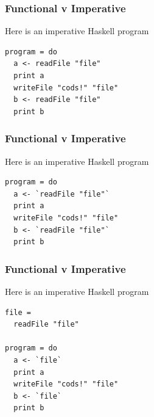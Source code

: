 \begin{frame}[fragile]
\frametitle{Functional v Imperative}
\begin{block}{Here is an imperative Haskell program}
\begin{lstlisting}[style=haskell,mathescape]
program = do
  a <- readFile "file"
  print a
  writeFile "cods!" "file"
  b <- readFile "file"
  print b
\end{lstlisting}
\end{block}
\end{frame}


\begin{frame}[fragile]
\frametitle{Functional v Imperative}
\begin{block}{Here is an imperative Haskell program}
\begin{lstlisting}[style=haskell,mathescape]
program = do
  a <- `readFile "file"`
  print a
  writeFile "cods!" "file"
  b <- `readFile "file"`
  print b
\end{lstlisting}
\end{block}
\end{frame}


\begin{frame}[fragile]
\frametitle{Functional v Imperative}
\begin{block}{Here is an imperative Haskell program}
\begin{lstlisting}[style=haskell,mathescape]
file =
  readFile "file"

program = do
  a <- `file`
  print a
  writeFile "cods!" "file"
  b <- `file`
  print b
\end{lstlisting}
\end{block}
\end{frame}


